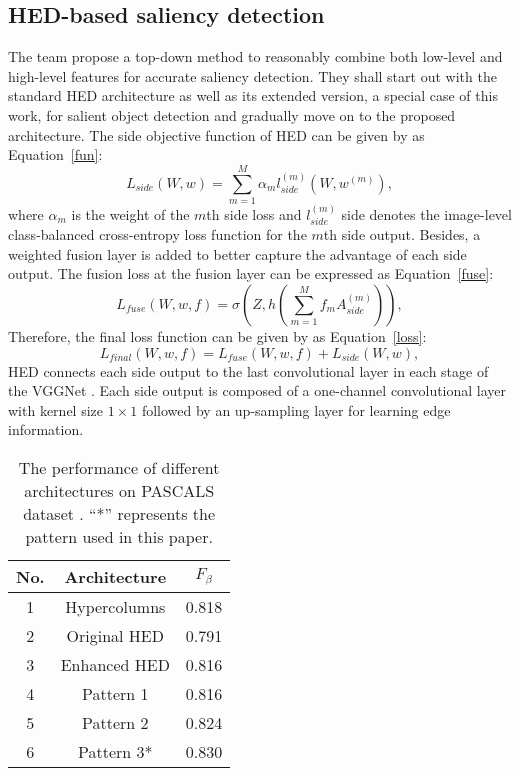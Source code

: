 \documentclass[10pt,twocolumn,letterpaper]{article}
\begin{document}
\subsection{HED-based saliency detection}
The team propose a top-down method to reasonably combine both low-level and high-level features for accurate saliency detection. They shall start out with the standard HED architecture as well as its extended version, a special case of this work, for salient object detection and gradually move on to the proposed architecture. The side objective function of HED can be given by as Equation~\ref{fun}:
\begin{equation}
L_{side}(W,w)=\sum_{m=1}^{M}\alpha_ml_{side}^{(m)}(W,w^{(m)}),  \label{fun} 
\end{equation}
where $\alpha_m$ is the weight of the $m$th side loss and $l_{side}^{(m)}$ side denotes the image-level class-balanced cross-entropy loss function for the $m$th side output. Besides, a weighted fusion layer is added to better capture the advantage of each side output. The fusion loss at the fusion layer can be expressed as Equation~\ref{fuse}:
\begin{equation}
L_{fuse}(W,w,f)=\sigma(Z,h(\sum_{m=1}^{M}f_mA_{side}^{(m)})), \label{fuse} 
\end{equation}
Therefore, the final loss function can be given by as Equation~\ref{loss}:
\begin{equation}
L_{final}(W,w,f)=L_{fuse}(W,w,f)+L_{side}(W,w), \label{loss} 
\end{equation}
HED connects each side output to the last convolutional layer in each stage of the VGGNet \cite{simonyan2014very}. Each side output is composed of a one-channel convolutional layer with kernel size $1\times 1$ followed by an up-sampling layer for learning edge information.

\begin{table}[tp]
	\begin{center}
	\caption{The performance of different architectures on PASCALS dataset \cite{Li2014The}. ``*'' represents the pattern used in this paper.} \label{Com}
	\begin{tabular}{c|c|c}
		\hline
		No. & Architecture & $F_\beta$ \\
		\hline
		1 & Hypercolumns \cite{Hariharan2014Hypercolumns} & 0.818 \\
		2 & Original HED \cite{Saining2015Holistically} & 0.791 \\
		3  & Enhanced HED & 0.816 \\
		4 & Pattern 1 & 0.816 \\
		5 & Pattern 2 & 0.824 \\
		6 & Pattern 3* & 0.830 \\
		\hline
	\end{tabular}
\end{center}
\end{table}
\end{document}
